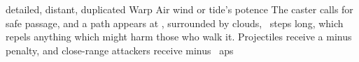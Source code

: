   {detailed, distant, duplicated}%
  {Warp}%
  {Air}%
  {wind or tide's potence}%
  {The caster calls for safe passage, and a path appears at \spellRange, surrounded by clouds, ~\glspl{step} long, which repels anything which might harm those who walk it.
  Projectiles receive a minus  penalty, and close-range attackers receive minus ~\glspl{ap}}%
  {}
